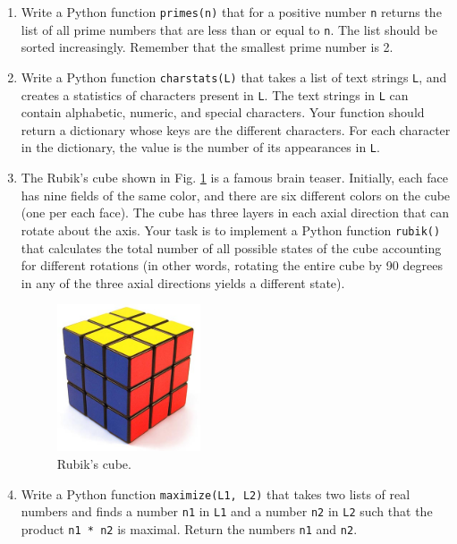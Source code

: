 \begin{enumerate}
\item Write a Python function {\tt primes(n)} that for a positive number {\tt n} returns the list 
      of all prime numbers that are less than or equal to {\tt n}. The list 
      should be sorted increasingly. Remember that the smallest prime number is 2.
\item Write a Python function {\tt charstats(L)} that takes a list of 
      text strings {\tt L}, and creates a statistics of characters present in {\tt L}. 
      The text strings in {\tt L} can contain alphabetic, numeric, and special characters. 
      Your function should return a dictionary whose keys are the different characters. 
      For each character in the dictionary, the value is the number of its appearances 
      in {\tt L}.
\item The Rubik's cube shown in Fig. \ref{fig:rubik} is a famous brain teaser. Initially,
      each face has nine fields of the same color, and there are six different colors on the 
      cube (one per each face).
      The cube has three layers in each axial direction that can rotate about the axis.
      Your task is to implement a Python function {\tt rubik()} that calculates the total 
      number of all possible states of the cube
      accounting for different rotations (in other words, rotating the entire 
      cube by 90 degrees in any of the three axial directions yields a different state).

\begin{figure}[!ht]
\begin{center}
\includegraphics[width=0.4\textwidth]{imgp/rubix_cube.jpg}
\end{center}
\vspace{-2mm}
\caption{Rubik's cube.}
\label{fig:rubik}
\end{figure}
\noindent

\item Write a Python function {\tt maximize(L1, L2)} that takes two lists of real numbers and 
finds a number {\tt n1} in {\tt L1} and a number {\tt n2} in {\tt L2} such that the product 
{\tt n1 * n2} is maximal. Return the numbers {\tt n1} and {\tt n2}.

\end{enumerate}

